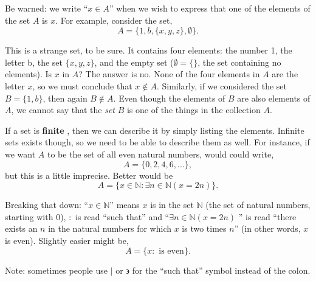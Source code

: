 \documentclass[10pt,]{book}
\newcommand{\terminology}[1]{\textbf{#1}}
\theoremstyle{plain}
\theoremstyle{definition}
\theoremstyle{definition}
\theoremstyle{definition}
\numberwithin{equation}{section}
\def\N{\mathbb N}
\def\st{:}
\begin{document}
      Be warned: we write ``\(x \in A\)'' when we wish to express that one of the elements of the set \(A\) is \(x\). For example, consider the set,
      \begin{equation*}
        A = \{1, b, \{x, y, z\}, \emptyset\}.
      \end{equation*}
\par

      This is a strange set, to be sure. It contains four elements: the number 1, the letter b, the set \(\{x,y,z\}\), and the empty set (\(\emptyset = \{ \}\), the set containing no elements). Is \(x\) in \(A\)? The answer is no. None of
      the four elements in \(A\) are the letter \(x\), so we must conclude that \(x \notin A\). Similarly, if we considered the set \(B = \{1,b\}\), then again \(B \notin A\). Even though the elements of \(B\) are also elements of \(A\),
      we cannot say that the \emph{set} \(B\) is one of the things in the collection \(A\).
\par

      If a set is
      \terminology{finite}
      , then we can describe it by simply listing the elements. Infinite sets exists though, so we need to be able to describe them as well. For instance, if we want \(A\) to be the set of all even natural numbers,
      would could write,
      \begin{equation*}
        A = \{0, 2, 4, 6, \ldots\},
      \end{equation*}
      but this is a little imprecise. Better would be
      \begin{equation*}
        A = \{x \in \N \st \exists n\in \N ( x = 2 n)\}.
      \end{equation*}
\par

      Breaking that down: ``\(x \in \N\)'' means \(x\) is in the set \(\N\) \label{notation-2}
 (the set of natural numbers, starting with 0), \(:\) \label{notation-3}
      is read ``such that'' and ``\(\exists n\in \N (x = 2n) \)
      '' is read ``there exists an \(n\) in the natural numbers for which \(x\) is two times \(n\)'' (in other words, \(x\) is even). Slightly easier might be,
      \begin{equation*}
        A = \{x \st \mbox{  is even} \}.
      \end{equation*}
\par

      Note: sometimes people use \(|\) or \(\backepsilon\) for the ``such that'' symbol instead of the colon.
\par
\end{document}
